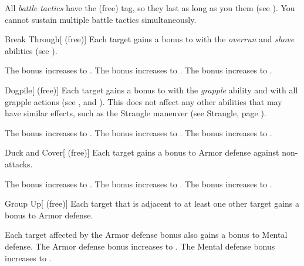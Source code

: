         All \textit{battle tactics} have the  (free) tag, so they last as long as you  them (see ).
        You cannot sustain multiple battle tactics simultaneously.

        {
            \begin{freeability}{Break Through}[ (free)]
                Each target gains a  bonus to  with the \textit{overrun} and \textit{shove} abilities (see ).

                \rankline
                 The bonus increases to .
                 The bonus increases to .
                 The bonus increases to .
            \end{freeability}

            \begin{freeability}{Dogpile}[ (free)]
                Each target gains a  bonus to  with the \textit{grapple} ability and with all grapple actions (see , and ).
                This does not affect any other abilities that may have similar effects, such as the Strangle maneuver (see Strangle, page ).

                \rankline
                 The bonus increases to .
                 The bonus increases to .
                 The bonus increases to .
            \end{freeability}

            \begin{freeability}{Duck and Cover}[ (free)]
                Each target gains a  bonus to Armor defense against non- attacks.

                \rankline
                 The bonus increases to .
                 The bonus increases to .
                 The bonus increases to .
            \end{freeability}

            \begin{freeability}{Group Up}[ (free)]
                Each target that is adjacent to at least one other target gains a  bonus to Armor defense.

                \rankline
                 Each target affected by the Armor defense bonus also gains a  bonus to Mental defense.
                 The Armor defense bonus increases to .
                 The Mental defense bonus increases to .
            \end{freeability}

}
